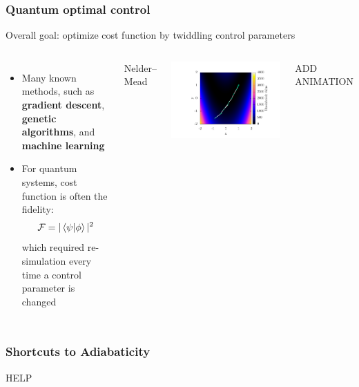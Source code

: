 \documentclass{beamer}
\begin{document}
\begin{frame}
\frametitle{Quantum optimal control}
Overall goal: optimize cost function by twiddling control parameters
\begin{columns}
\begin{itemize}
\pause
\item Many known methods, such as \textbf{gradient descent}, \textbf{genetic algorithms}, and \textbf{machine learning}
\pause
\item For quantum systems, cost function is often the fidelity:
$$
\mathcal{F}= |\braket{\psi|\phi}|^2
$$
which required re-simulation every time a control parameter is changed
\end{itemize}
\pause
{}
\begin{center}
Nelder--Mead
\end{center}
\includegraphics[width=\textwidth]{../data/1d/NM/NM.pdf}

\begin{center}
ADD ANIMATION
\end{center}

\end{columns}
\end{frame}

\begin{frame}
\frametitle{Shortcuts to Adiabaticity}

\center \Huge{HELP}
\end{frame}
\end{document}
